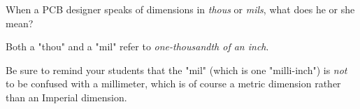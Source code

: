 

When a PCB designer speaks of dimensions in {\it thous} or {\it mils}, what does he or she mean?







Both a "thou" and a "mil" refer to {\it one-thousandth of an inch}.







Be sure to remind your students that the "mil" (which is one "milli-inch") is {\it not} to be confused with a millimeter, which is of course a metric dimension rather than an Imperial dimension.




